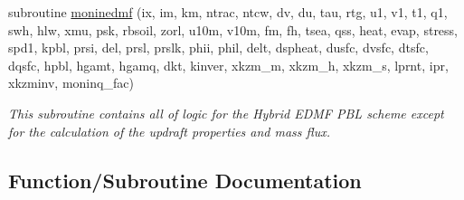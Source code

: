 \begin{DoxyCompactItemize}
\item 
subroutine \hyperlink{group___h_e_d_m_e_ga367b6dabfff601023af323f900db86d2}{moninedmf} (ix, im, km, ntrac, ntcw, dv, du, tau, rtg, u1, v1, t1, q1, swh, hlw, xmu, psk, rbsoil, zorl, u10m, v10m, fm, fh, tsea, qss, heat, evap, stress, spd1, kpbl, prsi, del, prsl, prslk, phii, phil, delt, dspheat, dusfc, dvsfc, dtsfc, dqsfc, hpbl, hgamt, hgamq, dkt, kinver, xkzm\+\_\+m, xkzm\+\_\+h, xkzm\+\_\+s, lprnt, ipr, xkzminv, moninq\+\_\+fac)
\begin{DoxyCompactList}\small\item\em This subroutine contains all of logic for the Hybrid E\+D\+MF P\+BL scheme except for the calculation of the updraft properties and mass flux. \end{DoxyCompactList}\end{DoxyCompactItemize}


\subsection{Function/\+Subroutine Documentation}
\mbox{\label{group___h_e_d_m_e_ga367b6dabfff601023af323f900db86d2}} 
